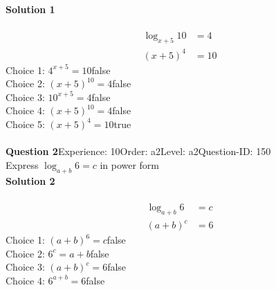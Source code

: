 \documentclass{article}
\begin{document}
\noindent\textbf{Solution 1}\\[2pt]
\\[-35pt]\begin{align*}
\log_{x+5}10&=4\\[2pt]
(x+5)^4&=10
\end{align*}
Choice 1: \hspace{20pt}$4^{x+5}=10$\hspace{20pt}false\\
Choice 2: \hspace{20pt}$(x+5)^{10}=4$\hspace{20pt}false\\
Choice 3: \hspace{20pt}$10^{x+5}=4$\hspace{20pt}false\\
Choice 4: \hspace{20pt}$(x+5)^{10}=4$\hspace{20pt}false\\
Choice 5: \hspace{20pt}$(x+5)^4=10$\hspace{20pt}true\\
\\[4pt]
\noindent\textbf{Question 2}\hspace{20pt}Experience: 10\hspace{20pt}Order: a2\hspace{20pt}Level: a2\hspace{20pt}Question-ID: 150\\[2pt]
Express $\log_{a+b}6=c$ in power form\\[4pt]
\noindent\textbf{Solution 2}\\[2pt]
\\[-35pt]\begin{align*}
\log_{a+b}6&=c\\[2pt]
(a+b)^c&=6
\end{align*}
Choice 1: \hspace{20pt}$(a+b)^6=c$\hspace{20pt}false\\
Choice 2: \hspace{20pt}$6^c=a+b$\hspace{20pt}false\\
Choice 3: \hspace{20pt}$(a+b)^c=6$\hspace{20pt}false\\
Choice 4: \hspace{20pt}$6^{a+b}=6$\hspace{20pt}false\\
\end{document}
